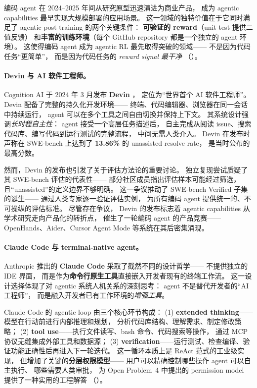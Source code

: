 编码 agent 在 2024--2025 年间从研究原型迅速演进为商业产品，
成为 agentic capabilities 最早实现大规模部署的应用场景。
这一领域的独特价值在于它同时满足了 agentic post-training 的两个关键条件：
\textbf{可验证的 reward}（unit test 提供二值反馈）
和\textbf{丰富的训练环境}（每个 GitHub repository 都是一个独立的 agent 环境）。
这使得编码 agent 成为 agentic RL 最先取得突破的领域——
不是因为代码任务``更简单''，
而是因为代码任务的 \emph{reward signal 最干净}
（）。

\paragraph{Devin 与 AI 软件工程师。}
Cognition AI 于 2024 年 3 月发布 \textbf{Devin} \citep{cognition2024devin}，
定位为``世界首个 AI 软件工程师''。
Devin 配备了完整的持久化开发环境——
终端、代码编辑器、浏览器在同一会话中持续运行，
agent 可以在多个工具之间自由切换并保持上下文。
其系统设计强调\emph{长时程自主性}：
agent 接受一个高层任务描述后，
自主完成从阅读 issue、搜索代码库、编写代码到运行测试的完整流程，
中间无需人类介入。
Devin 在发布时声称在 SWE-bench 上达到了 \textbf{13.86\%} 的 unassisted resolve rate，
是当时公布的最高分数。

然而，Devin 的发布也引发了关于评估方法论的重要讨论。
独立复现尝试质疑了其 SWE-bench 评估的代表性——
部分社区成员指出评估样本可能经过筛选，
且``unassisted''的定义边界不够明确。
这一争议推动了 SWE-bench Verified 子集的诞生——
通过人类专家逐一验证评估实例，
为所有编码 agent 提供统一的、不可操纵的评估标准。
尽管存在争议，
Devin 的发布标志着 agentic capabilities 从学术研究走向产品化的转折点，
催生了一轮编码 agent 的产品竞赛——
OpenHands、Aider、Cursor Agent Mode 等系统在其后密集涌现。

\paragraph{Claude Code 与 terminal-native agent。}
Anthropic 推出的 \textbf{Claude Code} \citep{anthropic2025claudecode}
采取了截然不同的设计哲学——
不提供独立的 IDE 界面，
而是作为\textbf{命令行原生工具}直接嵌入开发者现有的终端工作流。
这一设计选择体现了对 agentic 系统人机关系的深刻思考：
agent 不是替代开发者的``AI 工程师''，
而是融入开发者已有工作环境的\emph{增强工具}。

Claude Code 的 agentic loop 由三个核心环节构成：
(1) \textbf{extended thinking}——模型在行动前进行内部推理和规划，
分析代码库结构、理解需求、制定修改策略；
(2) \textbf{tool use}——执行文件读写、bash 命令、代码搜索等操作，
通过 MCP 协议无缝集成外部工具和数据源；
(3) \textbf{verification}——运行测试、检查编译、验证功能正确性后再进入下一轮迭代。
这一循环本质上是 ReAct 范式的工业级实现，
但增加了关键的\textbf{分层权限模型}——
用户可以精确控制哪些操作 agent 可以自主执行、
哪些需要人类审批，
为 Open Problem~4 中提出的 permission model 提供了一种实用的工程解答
（）。

